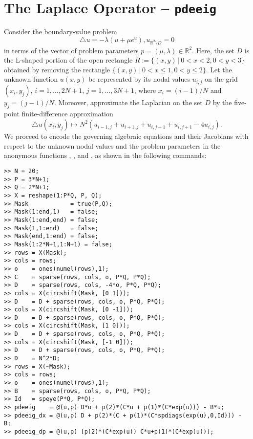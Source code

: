 \section{The Laplace Operator -- \texttt{pdeeig}}
Consider the boundary-value problem
\begin{equation}
\triangle u=-\lambda(u+\mu e^u), u_{\mathbb{R}^2\setminus D}=0
\end{equation}
in terms of the vector of problem parameters $p=(\mu,\lambda)\in\mathbb{R}^2$. Here, the set $D$ is the L-shaped portion of the open rectangle $R:=\{(x,y)\,|\,0<x<2, 0<y<3\}$ obtained by removing the rectangle $\{(x,y)\,|\,0<x\le 1,0<y\le 2\}$. Let the unknown function $u(x,y)$ be represented by its nodal values $u_{i,j}$ on the grid $(x_i,y_j)$, $i=1,\ldots,2N+1$, $j=1,\ldots,3N+1$, where $x_i=(i-1)/N$ and $y_j=(j-1)/N$. Moreover, approximate the Laplacian on the set $D$ by the five-point finite-difference approximation
\begin{equation}
\triangle u(x_i,y_j)\mapsto N^2\left(u_{i-1,j}+u_{i+1,j}+u_{i,j-1}+u_{i,j+1}-4u_{i,j}\right).
\end{equation}
We proceed to encode the governing algebraic equations and their Jacobians with respect to the unknown nodal values and the problem parameters in the anonymous functions , , and , as shown in the following commands:
\begin{lstlisting}[language=coco-highlight]
>> N = 20;
>> P = 3*N+1;
>> Q = 2*N+1;
>> X = reshape(1:P*Q, P, Q);
>> Mask            = true(P,Q);
>> Mask(1:end,1)   = false;
>> Mask(1:end,end) = false;
>> Mask(1,1:end)   = false;
>> Mask(end,1:end) = false;
>> Mask(1:2*N+1,1:N+1) = false;
>> rows = X(Mask);
>> cols = rows;
>> o    = ones(numel(rows),1);
>> C    = sparse(rows, cols, o, P*Q, P*Q);
>> D    = sparse(rows, cols, -4*o, P*Q, P*Q);
>> cols = X(circshift(Mask, [0 1]));
>> D    = D + sparse(rows, cols, o, P*Q, P*Q);
>> cols = X(circshift(Mask, [0 -1]));
>> D    = D + sparse(rows, cols, o, P*Q, P*Q);
>> cols = X(circshift(Mask, [1 0]));
>> D    = D + sparse(rows, cols, o, P*Q, P*Q);
>> cols = X(circshift(Mask, [-1 0]));
>> D    = D + sparse(rows, cols, o, P*Q, P*Q);
>> D    = N^2*D;
>> rows = X(~Mask);
>> cols = rows;
>> o    = ones(numel(rows),1);
>> B    = sparse(rows, cols, o, P*Q, P*Q);
>> Id   = speye(P*Q, P*Q);
>> pdeeig    = @(u,p) D*u + p(2)*(C*u + p(1)*(C*exp(u))) - B*u;
>> pdeeig_dx = @(u,p) D + p(2)*(C + p(1)*(C*spdiags(exp(u),0,Id))) - B;
>> pdeeig_dp = @(u,p) [p(2)*(C*exp(u)) C*u+p(1)*(C*exp(u))];
\end{lstlisting}
